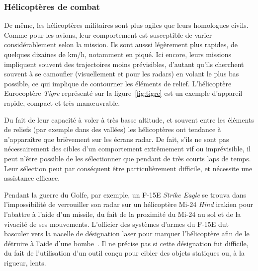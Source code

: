 	
	\subsubsection{Hélicoptères de combat}
	De même, les hélicoptères militaires sont plus agiles que leurs homologues civils. Comme pour les avions, leur comportement est susceptible de varier considérablement selon la mission. Ils sont ausssi légèrement plus rapides, de quelques dizaines de km/h, notamment en piqué. Ici encore, leurs missions impliquent souvent des trajectoires moins prévisibles, d'autant qu'ils cherchent souvent à se camoufler (visuellement et pour les radars) en volant le plus bas possible, ce qui implique de contourner les éléments de relief. L'hélicoptère Eurocoptère \emph{Tigre} représenté sur la figure~\ref{fig:tigre} est un exemple d'appareil rapide, compact et très manœuvrable.
	
	Du fait de leur capacité à voler à très basse altitude, et souvent entre les éléments de reliefs (par exemple dans des vallées) les hélicoptères ont tendance à n'apparaître que brièvement sur les écrans radar. De fait, s'ils ne sont pas nécessairement des cibles d'un comportement extrêmement vif ou imprévisible, il peut n'être possible de les sélectionner que pendant de très courts laps de temps. Leur sélection peut par conséquent être particulièrement difficile, et nécessite une assistance efficace.
	
	Pendant la guerre du Golfe, par exemple, un F-15E \emph{Strike Eagle} se trouva dans l'impossibilité de verrouiller son radar sur un hélicoptère Mi-24 \emph{Hind} irakien pour l'abattre à l'aide d'un missile, du fait de la proximité du Mi-24 au sol et de la vivacité de ses mouvements. L'officier des systèmes d'armes du F-15E dut basculer vers la nacelle de désignation laser pour \og marquer \fg{} l'hélicoptère afin de le détruire à l'aide d'une bombe~\cite{craig2007debrief}. Il ne précise pas si cette désignation fut difficile, du fait de l'utilisation d'un outil conçu pour cibler des objets statiques ou, à la rigueur, lents.
	
	
